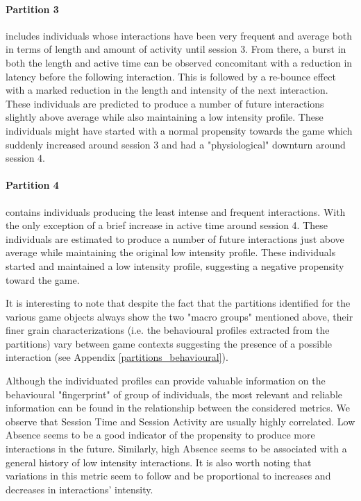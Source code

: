 \paragraph*{\textbf{Partition 3}} includes individuals whose interactions have been very frequent and average both in terms of length and amount of activity until session 3. From there, a burst in both the length and active time can be observed concomitant with a reduction in latency before the following interaction. This is followed by a re-bounce effect with a marked reduction in the length and intensity of the next interaction. These individuals are predicted to produce a number of future interactions slightly above average while also maintaining a low intensity profile. These individuals might have started with a normal propensity towards the game which suddenly increased around session 3 and had a "physiological" downturn around session 4. 

\paragraph*{\textbf{Partition 4}} contains individuals producing the least intense and frequent interactions. With the only exception of a brief increase in active time around session 4. These individuals are estimated to produce a number of future interactions just above average while maintaining the original low intensity profile. These individuals started and maintained a low intensity profile, suggesting a negative propensity toward the game. 

It is interesting to note that despite the fact that the partitions identified for the various game objects always show the two "macro groups" mentioned above, their finer grain characterizations (i.e. the behavioural profiles extracted from the partitions) vary between game contexts suggesting the presence of a possible interaction (see Appendix \ref{partitions_behavioural}).

Although the individuated profiles can provide valuable information on the behavioural "fingerprint" of group of individuals, the most relevant and reliable information can be found in the relationship between the considered metrics. We observe that Session Time and Session Activity are usually highly correlated. Low Absence seems to be a good indicator of the propensity to produce more interactions in the future. Similarly, high Absence seems to be associated with a general history of low intensity interactions. It is also worth noting that variations in this metric seem to follow and be proportional to increases and decreases in interactions' intensity. 

